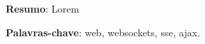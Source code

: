 {
\small
\noindent

\textbf{Resumo}: Lorem
	
\vspace{\onelineskip}

\textbf{Palavras-chave}: web, websockets, sse, ajax.
}
